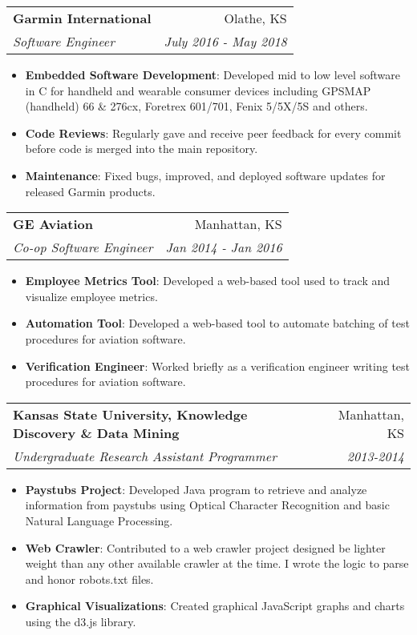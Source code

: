 \documentclass[a4paper,20pt]{article}
\makeatletter
\newcommand{\resumeItem}[2]{
  \item\small{
    \textbf{#1}{: #2 \vspace{-2pt}}
  }
}
\newcommand{\resumeSubheading}[4]{
  \vspace{-1pt}\item
    \begin{tabular*}{0.97\textwidth}{l@{\extracolsep{\fill}}r}
      \textbf{#1} & #2 \\
      \textit{#3} & \textit{#4} \\
    \end{tabular*}\vspace{-5pt}
}
\newcommand{\resumeItemListStart}{\begin{itemize}}
\newcommand{\resumeItemListEnd}{\end{itemize}\vspace{-5pt}}
\makeatother
\begin{document}
    \resumeSubheading
		{Garmin International}{Olathe, KS}
		{Software Engineer}{July 2016 - May 2018}
		\resumeItemListStart
        \resumeItem{Embedded Software Development}
          {Developed mid to low level software in C for handheld and wearable consumer devices
            including GPSMAP (handheld) 66 \& 276cx, Foretrex 601/701, Fenix 5/5X/5S and others.}
        \resumeItem{Code Reviews}
          {Regularly gave and receive peer feedback for every commit before code is merged into the main repository.}
        \resumeItem{Maintenance}
          {Fixed bugs, improved, and deployed software updates for released Garmin products.}
		\resumeItemListEnd

    \resumeSubheading
		{GE Aviation}{Manhattan, KS}
		{Co-op Software Engineer}{Jan 2014 - Jan 2016}
		\resumeItemListStart
        \resumeItem{Employee Metrics Tool}
          {Developed a web-based tool used to track and visualize employee metrics.}
        \resumeItem{Automation Tool}
          {Developed a web-based tool to automate batching of test procedures for aviation software.}
        \resumeItem{Verification Engineer}
          {Worked briefly as a verification engineer writing test procedures for aviation software.}
		\resumeItemListEnd

    \resumeSubheading
		{Kansas State University, Knowledge Discovery \& Data Mining}{Manhattan, KS}
		{Undergraduate Research Assistant Programmer}{2013-2014}
		\resumeItemListStart
        \resumeItem{Paystubs Project}
          {Developed Java program to retrieve and analyze information from paystubs using Optical Character Recognition and basic Natural Language Processing.}
        \resumeItem{Web Crawler}
          {Contributed to a web crawler project designed be lighter weight than any other available crawler at the time.
            I wrote the logic to parse and honor robots.txt files.}
        \resumeItem{Graphical Visualizations}
          {Created graphical JavaScript graphs and charts using the d3.js library.}
		\resumeItemListEnd

\end{document}
